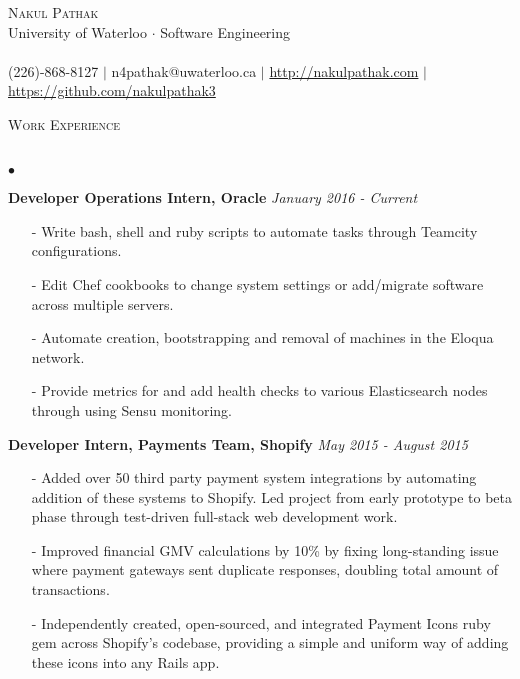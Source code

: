 \documentclass[10pt]{article}
\newcommand{\lineunder}{\vspace*{-8pt} \\ \hspace*{-18pt} \hrulefill \\}
\newcommand{\header}[1]{{\hspace*{-15pt}\vspace*{6pt} \textsc{#1}} \vspace*{-6pt} \lineunder }
\newenvironment{achievements}{\begin{list}{$\bullet$}{\topsep 0pt \itemsep -1.5pt \leftmargin 5pt}}{\vspace*{4pt}\end{list}}
\begin{document}
\small
\smallskip
\vspace*{-45pt}

\begin{center}
  {\Huge \scshape {Nakul Pathak}} \\
  \vspace*{6pt} 
{\fontsize{10}{1}\selectfont University of Waterloo $\cdot$ Software Engineering} \\
\vspace{-4pt}
\hspace*{-18pt} \hrulefill \\
\vspace{2pt}
\hspace*{-18pt} (226)-868-8127 $|$ n4pathak@uwaterloo.ca $|$ \url{http://nakulpathak.com} $|$  \url{https://github.com/nakulpathak3}
\vspace{-5pt}
\end{center}


\vspace{10pt}

\header{\fontsize{11}{12}\selectfont  Work Experience}
\begin{achievements}
\item \textbf{Developer Operations Intern, Oracle} \hfill \textit {January 2016 - Current}
\begin{itemize}
\item[-]Write bash, shell and ruby scripts to automate tasks through Teamcity configurations.
\vspace{2pt}
\item[-]Edit Chef cookbooks to change system settings or add/migrate software across multiple servers.
\vspace{2pt}
\item[-]Automate creation, bootstrapping and removal of machines in the Eloqua network.
\vspace{2pt}
\item[-]Provide metrics for and add health checks to various Elasticsearch nodes through using Sensu monitoring.
\end{itemize}
\vspace{5pt}
\item \textbf{Developer Intern, Payments Team, Shopify} \hfill \textit {May 2015 - August 2015}
\begin{itemize}
\item[-]Added over 50 third party payment system integrations by automating addition of these systems to Shopify. Led project from early prototype to beta phase through test-driven full-stack web development work.
\vspace{2pt}
\item[-]Improved financial GMV calculations by 10\% by fixing long-standing issue where payment gateways sent duplicate responses, doubling total amount of transactions. 
\vspace{2pt}
\item[-]Independently created, open-sourced, and integrated Payment Icons ruby gem across Shopify's codebase, providing a simple and uniform way of adding these icons into any Rails app.
\end{itemize}
\end{achievements}
\end{document}
